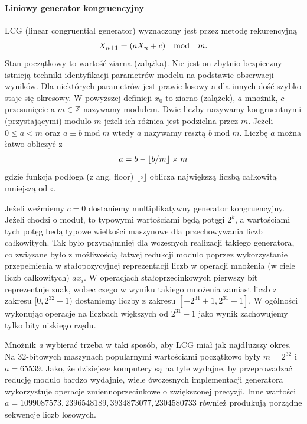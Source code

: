 \documentclass[a4paper,12pt,polish]{sphinxmanual}
\begin{document}
\paragraph{Liniowy generator kongruencyjny}
\label{ch5/chV011:liniowy-generator-kongruencyjny}
LCG (linear congruential generator) wyznaczony jest przez metodę rekurencyjną
\begin{gather}
\begin{split}X_{n+1} = (a X_n + c) \quad \text{mod} \quad m.\end{split}\notag
\end{gather}
Stan początkowy to wartość ziarna (zalążka). Nie jest on zbytnio bezpieczny - istnieją techniki identyfikacji
parametrów modelu na podstawie obserwacji wyników. Dla niektórych parametrów jest prawie losowy a dla
innych dość szybko staje się okresowy. W powyższej definicji $x_0$ to ziarno (zalążek),
$a$ mnożnik, $c$ przesunięcie a $m \in \mathbb{Z}$ nazywamy modułem. Dwie liczby nazywamy kongruentnymi
(przystającymi) modulo $m$ jeżeli ich różnica jest podzielna przez $m$. Jeżeli $0 \le a < m$ oraz
$a \equiv b \; \text{mod} \; m$ wtedy $a$ nazywamy resztą $b \; \text{mod} \; m$. Liczbę $a$ można łatwo obliczyć
z
\begin{gather}
\begin{split}a = b - \lfloor b/m \rfloor \times m\end{split}\notag
\end{gather}
gdzie funkcja podłoga (z ang. floor) $\lfloor \circ \rfloor$ oblicza największą liczbą całkowitą mniejszą od $\circ$.

Jeżeli weźmiemy $c = 0$ dostaniemy multiplikatywny generator kongruencyjny. Jeżeli chodzi o moduł, to typowymi wartościami
będą potęgi $2^k$, a wartościami tych potęg bedą typowe wielkości maszynowe dla przechowywania liczb całkowitych.
Tak było przynajmniej dla wczesnych realizacji takiego generatora, co związane było z możliwością łatwej redukcji modulo
poprzez wykorzystanie przepełnienia w stałopozycyjnej reprezentacji liczb w operacji mnożenia (w ciele liczb
całkowitych) $a x_i$. W operacjach stałoprzecinkowych pierwszy bit reprezentuje znak, wobec czego w wyniku takiego mnożenia
zamiast liczb z zakresu $[0, 2^{32} -1)$ dostaniemy liczby z zakresu $[-2^{31}+1, 2^{31}-1]$. W ogólności wykonując
operacje na liczbach większych od $2^{31}-1$ jako wynik zachowujemy tylko bity niskiego rzędu.

Mnożnik \emph{a} wybierać trzeba w taki sposób, aby LCG miał jak najdłuższy okres. Na 32-bitowych maszynach popularnymi wartościami
początkowo były $m=2^{32}$ i $a=65539$. Jako, że dzisiejsze komputery są na tyle wydajne, by przeprowadzać reducję
modulo bardzo wydajnie, wiele ówczesnych implementacji generatora wykorzystuje operacje zmiennoprzecinkowe o zwiększonej precyzji.
Inne wartości $a=1099087573, 2396548189, 3934873077, 2304580733$ również produkują porządne sekwencje liczb losowych.
\end{document}
